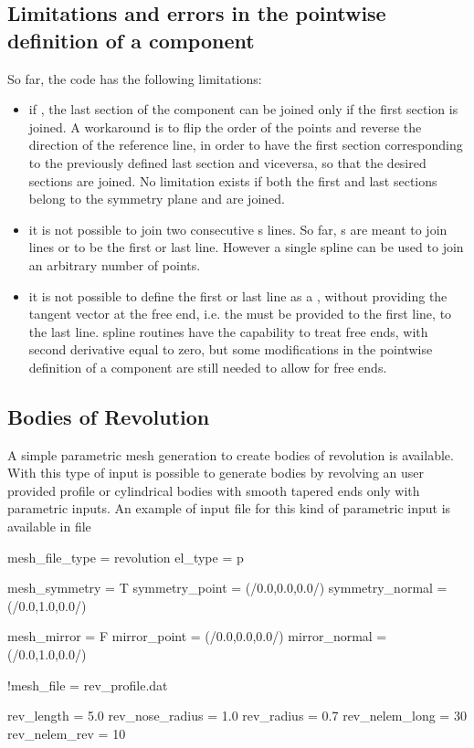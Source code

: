 \subsection{Limitations and errors in the pointwise definition of a component}
So far, the code has the following limitations:
\begin{itemize}
    \item if , the last section of the component 
    can be joined only if the first section is joined. A workaround is to 
    flip the order of the points and reverse the direction of the reference 
    line, in order to have the first section corresponding to the previously 
    defined last section and viceversa, so that the desired sections are joined. 
    No limitation exists if both the first and last sections belong to the 
    symmetry plane and are joined.
    
    \item it is not possible to join two consecutive s lines. 
    So far, s are meant to join  lines or to 
    be the first or last line. However a single spline can be used to join 
    an arbitrary number of points. 
    
    \item it is not possible to define the first or last line as a , 
    without providing the tangent vector at the free end, i.e. the  
    must be provided to the first line,  
    to the last line. spline routines have the capability to 
    treat free ends, with second derivative equal to zero, but 
    some modifications in the pointwise definition of a component 
    are still needed to allow for free ends.
    
\end{itemize}

\subsection{Bodies of Revolution}
\label{subs:Bodies_Revolution}
A simple parametric mesh generation to create bodies of revolution 
is available. With this type of input is possible to generate bodies 
by revolving an user provided profile or cylindrical bodies with smooth 
tapered ends only with parametric inputs. An example of input file 
for this kind of parametric input is available in file 

\begin{inputfile}[frame=single, 
  caption={Boies of revolution geometry definition }, 
  label={file:revolution_example_file.in}]
mesh_file_type = revolution
el_type = p

mesh_symmetry = T
symmetry_point = (/0.0,0.0,0.0/)
symmetry_normal = (/0.0,1.0,0.0/)

mesh_mirror = F
mirror_point = (/0.0,0.0,0.0/)
mirror_normal = (/0.0,1.0,0.0/)

!mesh_file = rev_profile.dat

rev_length = 5.0
rev_nose_radius = 1.0
rev_radius = 0.7
rev_nelem_long = 30
rev_nelem_rev = 10

\end{inputfile}

